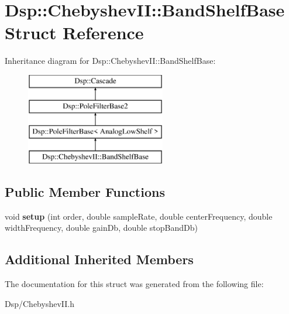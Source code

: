 \hypertarget{structDsp_1_1ChebyshevII_1_1BandShelfBase}{\section{Dsp\-:\-:Chebyshev\-I\-I\-:\-:Band\-Shelf\-Base Struct Reference}
\label{structDsp_1_1ChebyshevII_1_1BandShelfBase}
}
Inheritance diagram for Dsp\-:\-:Chebyshev\-I\-I\-:\-:Band\-Shelf\-Base\-:\begin{figure}[H]
\begin{center}
\leavevmode
\includegraphics[height=4.000000cm]{structDsp_1_1ChebyshevII_1_1BandShelfBase}
\end{center}
\end{figure}
\subsection*{Public Member Functions}
\begin{DoxyCompactItemize}
\item 
\hypertarget{structDsp_1_1ChebyshevII_1_1BandShelfBase_a2556e3635f0de99fe36eac60b2bbd6f5}{void {\bfseries setup} (int order, double sample\-Rate, double center\-Frequency, double width\-Frequency, double gain\-Db, double stop\-Band\-Db)}\label{structDsp_1_1ChebyshevII_1_1BandShelfBase_a2556e3635f0de99fe36eac60b2bbd6f5}

\end{DoxyCompactItemize}
\subsection*{Additional Inherited Members}


The documentation for this struct was generated from the following file\-:\begin{DoxyCompactItemize}
\item 
Dsp/Chebyshev\-I\-I.\-h\end{DoxyCompactItemize}
